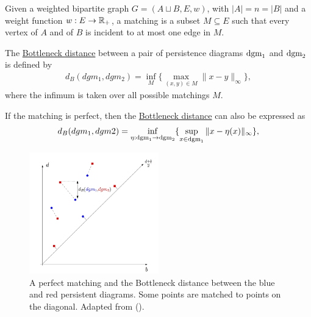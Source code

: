 \begin{defn}
Given a weighted bipartite graph $G = (A \sqcup B,E,w)$, with $|A| = n = |B|$ and a weight function $w : E \to \mathbb R_+$, a matching is a subset $M \subseteq E$ such that every vertex of $A$ and of $B$ is incident to at most one edge in $M$. 
\end{defn}
 
\begin{defn}
The \underline{Bottleneck distance} between a pair of persistence diagrams $\text{dgm}_1$ and $\text{dgm}_2$ is defined by
\begin{align}
    d_B(dgm_1, dgm_2) = \inf_M\{\max_{(x,y)\in M} \|x-y\|_\infty\},
\end{align}
where the infimum is taken over all possible matchings $M$.

If the matching is perfect, then the \underline{Bottleneck distance} can also be expressed as 
\begin{align}
    d_B(dgm_1, dgm2) = \inf_{\eta: \text{dgm}_1 \to \text{dgm}_2}\{\sup_{x\in\text{dgm}_1} \|x-\eta(x)\|_\infty\},
\end{align}
\end{defn}

   \begin{figure}[H]
   \label{matching}
        \centering \includegraphics[width=0.5\textwidth]{figures/matching.png}
            \caption{A perfect matching and the Bottleneck distance between the blue and red persistent diagrams. Some points are matched to points on the diagonal. Adapted from (\cite{chazal_introduction_2021}).} \label{fig:perfect-matching}
    \end{figure}
 
